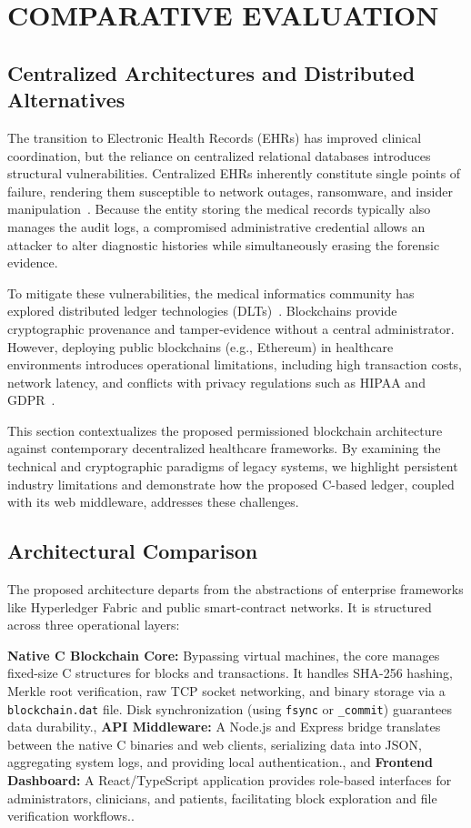 \documentclass[12pt]{article}
\begin{document}
\newpage
\section{COMPARATIVE EVALUATION}

\subsection{Centralized Architectures and Distributed Alternatives}

The transition to Electronic Health Records (EHRs) has improved clinical coordination, but the reliance on centralized relational databases introduces structural vulnerabilities. Centralized EHRs inherently constitute single points of failure, rendering them susceptible to network outages, ransomware, and insider manipulation~\cite{1}. Because the entity storing the medical records typically also manages the audit logs, a compromised administrative credential allows an attacker to alter diagnostic histories while simultaneously erasing the forensic evidence.

To mitigate these vulnerabilities, the medical informatics community has explored distributed ledger technologies (DLTs)~\cite{5}. Blockchains provide cryptographic provenance and tamper-evidence without a central administrator. However, deploying public blockchains (e.g., Ethereum) in healthcare environments introduces operational limitations, including high transaction costs, network latency, and conflicts with privacy regulations such as HIPAA and GDPR~\cite{5}.

This section contextualizes the proposed permissioned blockchain architecture against contemporary decentralized healthcare frameworks. By examining the technical and cryptographic paradigms of legacy systems, we highlight persistent industry limitations and demonstrate how the proposed C-based ledger, coupled with its web middleware, addresses these challenges.

\subsection{Architectural Comparison}

The proposed architecture departs from the abstractions of enterprise frameworks like Hyperledger Fabric and public smart-contract networks. It is structured across three operational layers:

 \textbf{Native C Blockchain Core:} Bypassing virtual machines, the core manages fixed-size C structures for blocks and transactions. It handles SHA-256 hashing, Merkle root verification, raw TCP socket networking, and binary storage via a \texttt{blockchain.dat} file. Disk synchronization (using \texttt{fsync} or \texttt{\_commit}) guarantees data durability., \textbf{API Middleware:} A Node.js and Express bridge translates between the native C binaries and web clients, serializing data into JSON, aggregating system logs, and providing local authentication., and \textbf{Frontend Dashboard:} A React/TypeScript application provides role-based interfaces for administrators, clinicians, and patients, facilitating block exploration and file verification workflows..
\end{document}
